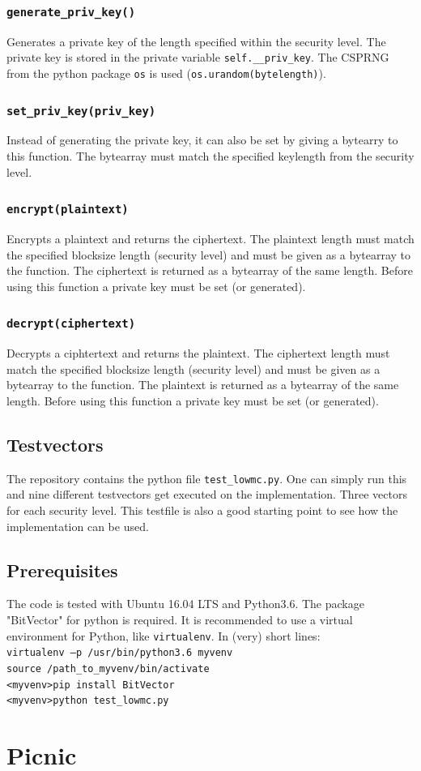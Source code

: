 \documentclass[]{article}
\begin{document}
\subsubsection{\texttt{generate\_priv\_key()}}
Generates a private key of the length specified within the security level. The private key is stored in the private variable \texttt{self.\_\_priv\_key}. The CSPRNG from the python package \texttt{os} is used (\texttt{os.urandom(bytelength)}).
\subsubsection{\texttt{set\_priv\_key(priv\_key)}}
Instead of generating the private key, it can also be set by giving a bytearry to this function. The bytearray must match the specified keylength from the security level.
\subsubsection{\texttt{encrypt(plaintext)}}
Encrypts a plaintext and returns the ciphertext. The plaintext length must match the specified blocksize length (security level) and must be given as a bytearray to the function. The ciphertext is returned as a bytearray of the same length. Before using this function a private key must be set (or generated).
\subsubsection{\texttt{decrypt(ciphertext)}}
Decrypts a ciphtertext and returns the plaintext. The ciphertext length must match the specified blocksize length (security level) and must be given as a bytearray to the function. The plaintext is returned as a bytearray of the same length. Before using this function a private key must be set (or generated).
\subsection{Testvectors}
The repository contains the python file \texttt{test\_lowmc.py}. One can simply run this and nine different testvectors get executed on the implementation. Three vectors for each security level. This testfile is also a good starting point to see how the implementation can be used.
\subsection{Prerequisites}
The code is tested with Ubuntu 16.04 LTS and Python3.6. The package "BitVector" for python is required. It is recommended to use a virtual environment for Python, like \texttt{virtualenv}. In (very) short lines:\\
\texttt{virtualenv --p /usr/bin/python3.6 myvenv}\\
\texttt{source /path\_to\_myvenv/bin/activate}\\
\texttt{<myvenv>pip install BitVector}\\
\texttt{<myvenv>python test\_lowmc.py}\\
\section{Picnic}



\end{document}
